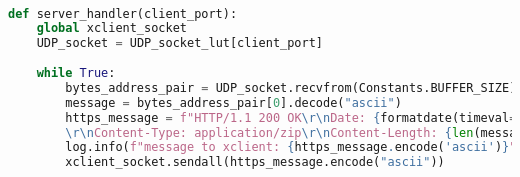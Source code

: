 ‫
\begin{latin}
\begin{lstlisting}[firstnumber=78, language=Python]
def server_handler(client_port):
	global xclient_socket
	UDP_socket = UDP_socket_lut[client_port]
    
	while True:
		bytes_address_pair = UDP_socket.recvfrom(Constants.BUFFER_SIZE)
		message = bytes_address_pair[0].decode("ascii")
		https_message = f"HTTP/1.1 200 OK\r\nDate: {formatdate(timeval=None, localtime=False, usegmt=True)}\
		\r\nContent-Type: application/zip\r\nContent-Length: {len(message)}\r\n\r\n{client_port}\r\n\r\n{message}"
		log.info(f"message to xclient: {https_message.encode('ascii')}")
		xclient_socket.sendall(https_message.encode("ascii"))
\end{lstlisting}
\end{latin}

